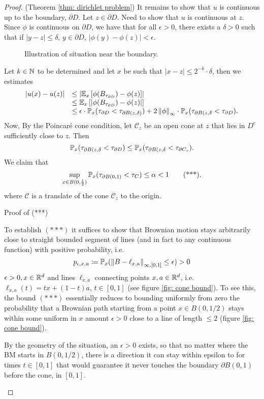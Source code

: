 \documentclass{article}
\begin{document}
\begin{proof}{(Theorem \ref{thm: dirichlet problem})}
    It remains to show that $ u$ is continuous up to the boundary, $ \partial D$. Let $ z\in \partial D$. Need to show that $ u$ is continuous at $ z$. Since $ \phi$ is continuous on $ \partial D$, we have that for all $ \epsilon>0$, there exists a $ \delta >0$ such that if $ |y-z|\leq \delta$, $ y\in \partial D$, $ |\phi(y)-\phi(z)|<\epsilon$. 
\begin{figure}[H]
	    \centering
	    
	    \caption{Illustration of situation near the boundary.}
	    \label{fig: nested discs delta}
	\end{figure}
    Let $ k\in \mathbb{N}$ to be determined and let $ x$ be such that $ |x-z|\leq 2^{-k}\cdot \delta$, then we estimates 
    \[
    \begin{array}{ll}
        |u(x)-u(z)| &\leq \left| \mathbb{E}_{x}\left[ \phi(B_{\tau_{\partial D}})-\phi(z) \right] \right|\\
         &\leq  \mathbb{E}_{x}\left[| \phi(B_{\tau_{\partial D}})-\phi(z)| \right] \\ 
	 &\leq \epsilon \cdot \mathbb{P}_{x}(\tau_{\partial D}<\tau_{\partial B(z,\delta)}) + 2\left\lVert\phi\right\rVert_{\infty}\cdot \mathbb{P}_{x}(\tau_{\partial B(z,\delta}<\tau_{\partial D}).	 
    \end{array}
    \]
   Now, By the Poincar\'{e} cone condition, let $  \mathcal{C}_{z}$ be an open cone at $ z$ that lies in $ D^{c}$ sufficiently close to $ z$. Then 
	 \[
	\mathbb{P}_{x}(\tau_{\partial B(z,\delta}<\tau_{\partial D})\leq \mathbb{P}_{x}(\tau_{\partial B(z,\delta}<\tau_{\partial C_{z}}).
	 \]
We claim that 
\[
	\displaystyle\sup_{x\in B(0, \frac{1}{2})}\mathbb{P}_{x}(\tau_{\partial B(0,1)}<\tau_{C})\leq \alpha <1 \tag{***}.
\]
where $ \mathcal{C}$ is a translate of the cone $ \mathcal{C}_{z}$ to the origin. 
\begin{examplesblock}{Proof of (***)}\label{aside: proof cone bound}
\parbox[b]{0.5\textwidth}{To establish $ (***)$ it suffices to show that Brownian motion stays arbitrarily close to straight bounded segment of lines (and in fact to any continuous function) with positive probability, i.e. 
\[
	p_{\epsilon, x, a} \coloneqq \mathbb{P}_{x}(\left\lVert B-\ell_{x,a}\right\rVert_{\infty, [0,1]}\leq \epsilon) >0 
\]
$ \epsilon >0, x\in \mathbb{R}^{d}$ and lines $ \ell_{x,a}$ connecting points $x,a\in \mathbb{R}^{d}$, i.e. $\ell_{x,a}(t) = tx + (1-t)a$, $ t\in [0,1]$ (see figure \ref{fig: cone bound}). To see this, the bound $ (***)$ essentially reduces to bounding uniformly from zero the probability that a Brownian path starting from a point $ x\in B(0, 1/2)$ stays within some uniform in $ x$ amount $ \epsilon > 0$ close to a line of length $ \leq 2$ (figure \ref{fig: cone bound}).\\ }\makebox[1cm]{}\parbox[b]{0.4\textwidth}{ 
	    \label{fig: cone bound}
}
By the geometry of the situation, an $ \epsilon>0$ exists, so that no matter where the BM starts in $ B(0,1/2)$, there is a direction it can stay within epsilon to for times $t \in [0,1]$ that would guarantee it never touches the boundary $ \partial B(0,1)$ before the cone, in $ [0,1]$. \\  


\end{examplesblock}
\end{proof}
\end{document}
